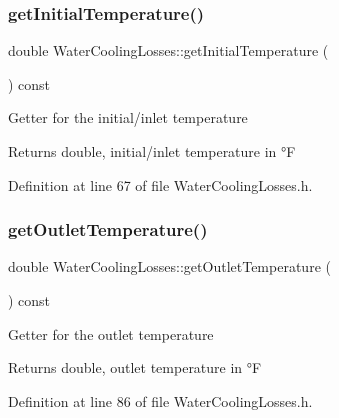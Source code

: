 \subsubsection{\texorpdfstring{get\+Initial\+Temperature()}{getInitialTemperature()}}
{\footnotesize\ttfamily double Water\+Cooling\+Losses\+::get\+Initial\+Temperature (\begin{DoxyParamCaption}{ }\end{DoxyParamCaption}) const\hspace{0.3cm}{\ttfamily [inline]}}

Getter for the initial/inlet temperature

\begin{DoxyReturn}{Returns}
double, initial/inlet temperature in °F 
\end{DoxyReturn}


Definition at line 67 of file Water\+Cooling\+Losses.\+h.

\mbox{\label{class_water_cooling_losses_a79fb78755e813b2a3aa36ccd8ccebf7a}} 
\subsubsection{\texorpdfstring{get\+Outlet\+Temperature()}{getOutletTemperature()}}
{\footnotesize\ttfamily double Water\+Cooling\+Losses\+::get\+Outlet\+Temperature (\begin{DoxyParamCaption}{ }\end{DoxyParamCaption}) const\hspace{0.3cm}{\ttfamily [inline]}}

Getter for the outlet temperature

\begin{DoxyReturn}{Returns}
double, outlet temperature in °F 
\end{DoxyReturn}


Definition at line 86 of file Water\+Cooling\+Losses.\+h.

\mbox{\label{class_water_cooling_losses_abf4d64d9261818af331613791374d42f}} 
